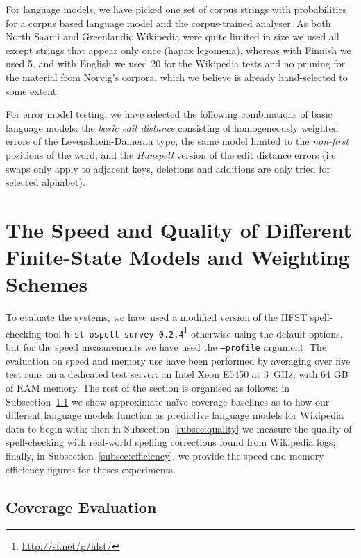 \documentclass[a4paper,12pt]{article}
\begin{document}
For language models, we have picked one set of corpus strings with
probabilities for a corpus based language model and the corpus-trained
analyser. As both North Saami and Greenlandic Wikipedia were quite limited in
size we used all except strings that appear only once (hapax legomena), whereas
with Finnish we used 5, and with English we used 20 for the Wikipedia
tests and no pruning for the material from Norvig's corpora, which we believe
is already hand-selected to some extent.

For error model testing, we have selected the following combinations of basic
language models: the \emph{basic edit distance} consisting of homogeneously
weighted errors of the Levenshtein-Damerau type, the same model limited to the
\emph{non-first} positions of the word, and the \emph{Hunspell} version of the edit
distance errors (i.e. swaps only apply to adjacent keys, deletions and
additions are only tried for selected alphabet).


\section{The Speed and Quality of Different Finite-State Models and Weighting
Schemes}
\label{sec:evaluation}

To evaluate the systems, we have used a modified version of the HFST
spell-checking tool \texttt{hfst-ospell-survey
0.2.4}\footnote{\url{http://sf.net/p/hfst/}} otherwise using the default
options, but for the speed measurements we have used the \texttt{--profile}
argument. The evaluation on speed and memory use have been performed by
averaging over five test runs on a dedicated test server: an Intel
Xeon E5450 at 3~GHz, with 64 GB of RAM memory. The rest of the section is
organised as follows: in Subsection~\ref{subsec:coverage} we show approximate
naïve coverage baselines as to how our different language models function
as predictive language models for Wikipedia data to begin with; then
in Subsection~\ref{subsec:quality} we measure the quality of spell-checking
with real-world spelling corrections found from Wikipedia logs; finally, in
Subsection~\ref{subsec:efficiency}, we provide the speed and memory
efficiency figures for theses experiments.

\subsection{Coverage Evaluation}
\label{subsec:coverage}
\end{document}
